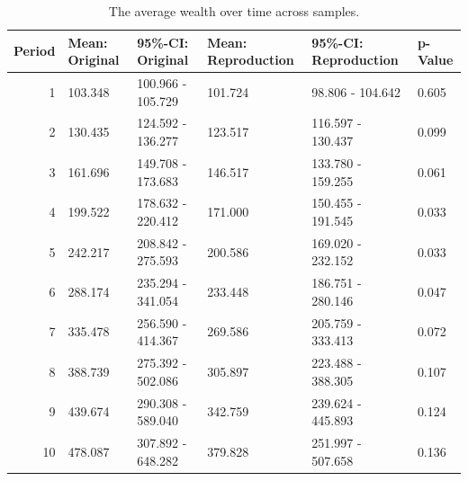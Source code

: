 \documentclass[
  authoryear,
  review,
  3p,
  onecolumn]{elsarticle}
\begin{document}
\hypertarget{tbl-wealth-periods}{}
\begin{table}
\caption{\label{tbl-wealth-periods}The average wealth over time across samples. }\tabularnewline

\centering
\begin{tabular}{r|l|l|l|l|l}
\hline
Period & Mean: Original & 95\%-CI: Original & Mean: Reproduction & 95\%-CI: Reproduction & p-Value\\
\hline
1 & 103.348 & 100.966 - 105.729 & 101.724 & 98.806 - 104.642 & 0.605\\
\hline
2 & 130.435 & 124.592 - 136.277 & 123.517 & 116.597 - 130.437 & 0.099\\
\hline
3 & 161.696 & 149.708 - 173.683 & 146.517 & 133.780 - 159.255 & 0.061\\
\hline
4 & 199.522 & 178.632 - 220.412 & 171.000 & 150.455 - 191.545 & 0.033\\
\hline
5 & 242.217 & 208.842 - 275.593 & 200.586 & 169.020 - 232.152 & 0.033\\
\hline
6 & 288.174 & 235.294 - 341.054 & 233.448 & 186.751 - 280.146 & 0.047\\
\hline
7 & 335.478 & 256.590 - 414.367 & 269.586 & 205.759 - 333.413 & 0.072\\
\hline
8 & 388.739 & 275.392 - 502.086 & 305.897 & 223.488 - 388.305 & 0.107\\
\hline
9 & 439.674 & 290.308 - 589.040 & 342.759 & 239.624 - 445.893 & 0.124\\
\hline
10 & 478.087 & 307.892 - 648.282 & 379.828 & 251.997 - 507.658 & 0.136\\
\hline
\end{tabular}
\end{table}
\end{document}

